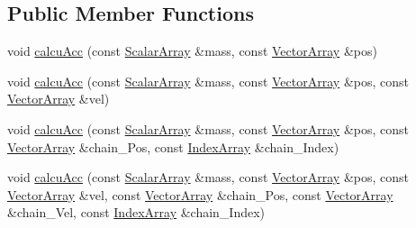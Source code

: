 \subsection*{Public Member Functions}
\begin{DoxyCompactItemize}
\item 
void \mbox{\hyperlink{struct_space_h_1_1_empty_force_a83468f94ac05624de3f8e492f3171560}{calcu\+Acc}} (const \mbox{\hyperlink{struct_space_h_1_1_empty_force_afdeb66410650cdb1e2e3b1e1fd79540c}{Scalar\+Array}} \&mass, const \mbox{\hyperlink{struct_space_h_1_1_empty_force_a06ad868879a6fa5def9c7f9fd75fffde}{Vector\+Array}} \&pos)
\item 
void \mbox{\hyperlink{struct_space_h_1_1_empty_force_af5373ca3798b19d9b4eb155c3fe7cf46}{calcu\+Acc}} (const \mbox{\hyperlink{struct_space_h_1_1_empty_force_afdeb66410650cdb1e2e3b1e1fd79540c}{Scalar\+Array}} \&mass, const \mbox{\hyperlink{struct_space_h_1_1_empty_force_a06ad868879a6fa5def9c7f9fd75fffde}{Vector\+Array}} \&pos, const \mbox{\hyperlink{struct_space_h_1_1_empty_force_a06ad868879a6fa5def9c7f9fd75fffde}{Vector\+Array}} \&vel)
\item 
void \mbox{\hyperlink{struct_space_h_1_1_empty_force_aef0a45bc07150151ac18c6e180784e56}{calcu\+Acc}} (const \mbox{\hyperlink{struct_space_h_1_1_empty_force_afdeb66410650cdb1e2e3b1e1fd79540c}{Scalar\+Array}} \&mass, const \mbox{\hyperlink{struct_space_h_1_1_empty_force_a06ad868879a6fa5def9c7f9fd75fffde}{Vector\+Array}} \&pos, const \mbox{\hyperlink{struct_space_h_1_1_empty_force_a06ad868879a6fa5def9c7f9fd75fffde}{Vector\+Array}} \&chain_\+Pos, const \mbox{\hyperlink{struct_space_h_1_1_empty_force_a25e0bd933dd3715e315c1abdb6843c36}{Index\+Array}} \&chain_\+Index)
\item 
void \mbox{\hyperlink{struct_space_h_1_1_empty_force_a60c8642978737f561503d41d3dee90d7}{calcu\+Acc}} (const \mbox{\hyperlink{struct_space_h_1_1_empty_force_afdeb66410650cdb1e2e3b1e1fd79540c}{Scalar\+Array}} \&mass, const \mbox{\hyperlink{struct_space_h_1_1_empty_force_a06ad868879a6fa5def9c7f9fd75fffde}{Vector\+Array}} \&pos, const \mbox{\hyperlink{struct_space_h_1_1_empty_force_a06ad868879a6fa5def9c7f9fd75fffde}{Vector\+Array}} \&vel, const \mbox{\hyperlink{struct_space_h_1_1_empty_force_a06ad868879a6fa5def9c7f9fd75fffde}{Vector\+Array}} \&chain_\+Pos, const \mbox{\hyperlink{struct_space_h_1_1_empty_force_a06ad868879a6fa5def9c7f9fd75fffde}{Vector\+Array}} \&chain_\+Vel, const \mbox{\hyperlink{struct_space_h_1_1_empty_force_a25e0bd933dd3715e315c1abdb6843c36}{Index\+Array}} \&chain_\+Index)
\item 

\end{DoxyCompactItemize}

